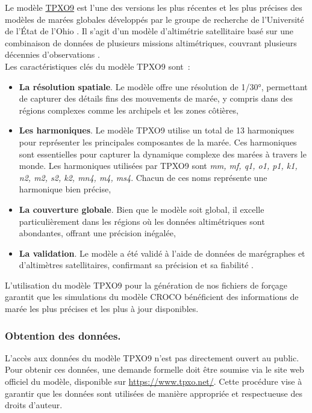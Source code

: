 Le modèle \href{https://www.tpxo.net/global/tpxo9-atlas}{TPXO9} est l'une des versions les plus récentes et les plus précises des modèles de marées globales développés par le groupe de recherche de l'Université de l'État de l'Ohio \cite{egbert2002efficient, erofeeva2010high}. Il s'agit d'un modèle d'altimétrie satellitaire basé sur une combinaison de données de plusieurs missions altimétriques, couvrant plusieurs décennies d'observations \cite{ray2012tide}.\\

Les caractéristiques clés du modèle TPXO9 sont~:
\begin{itemize}
	\item \textbf{La résolution spatiale}. Le modèle offre une résolution de 1/30°, permettant de capturer des détails fins des mouvements de marée, y compris dans des régions complexes comme les archipels et les zones côtières,
	\item \textbf{Les harmoniques}. Le modèle TPXO9 utilise un total de 13 harmoniques pour représenter les principales composantes de la marée. Ces harmoniques sont essentielles pour capturer la dynamique complexe des marées à travers le monde. Les harmoniques utilisées par TPXO9 sont \textit{mm, mf, q1, o1, p1, k1, n2, m2, s2, k2, mn4, m4, ms4}. Chacun de ces noms représente une harmonique bien précise,
	\item \textbf{La couverture globale}. Bien que le modèle soit global, il excelle particulièrement dans les régions où les données altimétriques sont abondantes, offrant une précision inégalée,
	\item \textbf{La validation}. Le modèle a été validé à l'aide de données de marégraphes et d'altimètres satellitaires, confirmant sa précision et sa fiabilité \og \cite{stammer2014accuracy}\fg{}.
\end{itemize}

L'utilisation du modèle TPXO9 pour la génération de nos fichiers de forçage garantit que les simulations du modèle CROCO bénéficient des informations de marée les plus précises et les plus à jour disponibles.

\subsubsection{Obtention des données.}

L'accès aux données du modèle TPXO9 n'est pas directement ouvert au public. Pour obtenir ces données, une demande formelle doit être soumise via le site web officiel du modèle, disponible sur \url{https://www.tpxo.net/}. Cette procédure vise à garantir que les données sont utilisées de manière appropriée et respectueuse des droits d'auteur.\\

